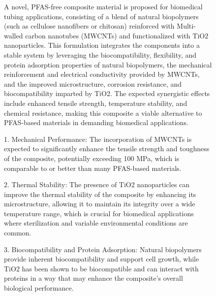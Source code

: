 \begin{figure}[htbp]
  \begin{mdframed}[
    frametitle={Generated Hypothesis as a Result of Depth-First Search (DFS) Algorithm},
    frametitlefont=\bfseries\sffamily\small,
    backgroundcolor=white,
    linecolor=black,
    linewidth=0.5pt,
    innerleftmargin=6pt,
    innerrightmargin=6pt,
    innertopmargin=6pt,
    innerbottommargin=6pt
  ]
    \ttfamily\scriptsize
    
    \textbf{}
    
    A novel, PFAS-free composite material is proposed for biomedical tubing applications, consisting of a blend of natural biopolymers (such as cellulose nanofibers or chitosan) reinforced with Multi-walled carbon nanotubes (MWCNTs) and functionalized with TiO2 nanoparticles. This formulation integrates the components into a stable system by leveraging the biocompatibility, flexibility, and protein adsorption properties of natural biopolymers, the mechanical reinforcement and electrical conductivity provided by MWCNTs, and the improved microstructure, corrosion resistance, and biocompatibility imparted by TiO2. The expected synergistic effects include enhanced tensile strength, temperature stability, and chemical resistance, making this composite a viable alternative to PFAS-based materials in demanding biomedical applications.
    
    \textbf{}
    
    1. Mechanical Performance: The incorporation of MWCNTs is expected to significantly enhance the tensile strength and toughness of the composite, potentially exceeding 100 MPa, which is comparable to or better than many PFAS-based materials.
    
    2. Thermal Stability: The presence of TiO2 nanoparticles can improve the thermal stability of the composite by enhancing its microstructure, allowing it to maintain its integrity over a wide temperature range, which is crucial for biomedical applications where sterilization and variable environmental conditions are common.
    
    3. Biocompatibility and Protein Adsorption: Natural biopolymers provide inherent biocompatibility and support cell growth, while TiO2 has been shown to be biocompatible and can interact with proteins in a way that may enhance the composite's overall biological performance.
    
    \textbf{}
    

\end{mdframed}
\end{figure}
